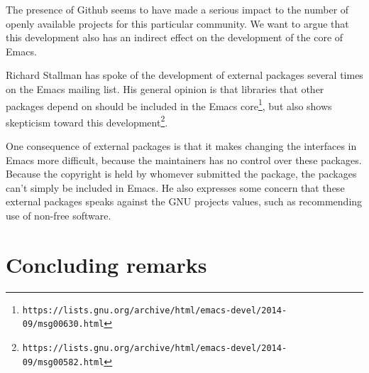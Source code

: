 \documentclass[a4paper,11pt]{article} %
\begin{document}
The presence of Github seems to have made a serious impact to the number of
openly available projects for this particular community. We want to argue
that this development also has an indirect effect on the development of the
core of Emacs.

Richard Stallman has spoke of the development of external packages several
times on the Emacs mailing list. His general opinion is that libraries that
other packages depend on should be included in the Emacs
core\footnote{\texttt{https://lists.gnu.org/archive/html/emacs-devel/2014-09/msg00630.html}},
but also shows skepticism toward this
development\footnote{\texttt{https://lists.gnu.org/archive/html/emacs-devel/2014-09/msg00582.html}}.

One consequence of external packages is that it makes changing the
interfaces in Emacs more difficult, because the maintainers has no control
over these packages. Because the copyright is held by whomever submitted the
package, the packages can't simply be included in Emacs. He also expresses
some concern that these external packages speaks against the GNU projects
values, such as recommending use of non-free software.

\section{Concluding remarks}

\printbibliography
\end{document}
